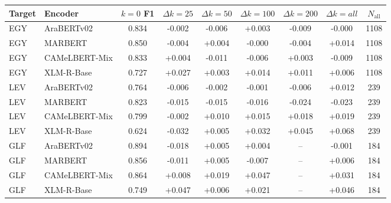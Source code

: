 \begin{tabular}{llcccccc|c}
\toprule
\textbf{Target} & \textbf{Encoder} & $k{=}0$ F1 & $\Delta k{=}25$ & $\Delta k{=}50$ & $\Delta k{=}100$ & $\Delta k{=}200$ & $\Delta k{=}all$ & $N_{\text{all}}$ \\
\midrule
EGY & AraBERTv02 & 0.834 & -0.002 & -0.006 & +0.003 & -0.009 & -0.000 & 1108 \\
EGY & MARBERT & 0.850 & -0.004 & +0.004 & -0.000 & -0.004 & +0.014 & 1108 \\
EGY & CAMeLBERT-Mix & 0.833 & +0.004 & -0.011 & -0.006 & +0.003 & -0.009 & 1108 \\
EGY & XLM-R-Base & 0.727 & +0.027 & +0.003 & +0.014 & +0.011 & +0.006 & 1108 \\
LEV & AraBERTv02 & 0.764 & -0.006 & -0.002 & -0.001 & -0.006 & +0.012 & 239 \\
LEV & MARBERT & 0.823 & -0.015 & -0.015 & -0.016 & -0.024 & -0.023 & 239 \\
LEV & CAMeLBERT-Mix & 0.799 & -0.002 & +0.010 & +0.015 & +0.018 & +0.019 & 239 \\
LEV & XLM-R-Base & 0.624 & -0.032 & +0.005 & +0.032 & +0.045 & +0.068 & 239 \\
GLF & AraBERTv02 & 0.894 & -0.018 & +0.005 & +0.004 & -- & -0.001 & 184 \\
GLF & MARBERT & 0.856 & -0.011 & +0.005 & -0.007 & -- & +0.006 & 184 \\
GLF & CAMeLBERT-Mix & 0.864 & +0.008 & +0.019 & +0.047 & -- & +0.031 & 184 \\
GLF & XLM-R-Base & 0.749 & +0.047 & +0.006 & +0.021 & -- & +0.046 & 184 \\
\bottomrule
\end{tabular}
